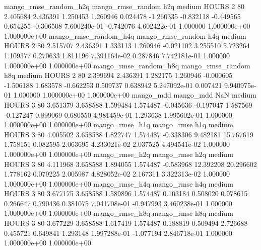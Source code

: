 mango_rmse_random_h2q mango_rmse_random                  h2q     medium    HOURS                 2 80  2.405684       2.436391 1.250453       1.260946    0.024478     -1.260335     -0.832118    -0.449565       0.654255 -0.306508 7.600240e-01    -0.742076   4.602422e-01            1.000000    1.000000e+00        1.000000e+00
mango_rmse_random_h4q mango_rmse_random                  h4q     medium    HOURS                 2 80  2.515707       2.436391 1.333113       1.260946   -0.021102      3.255510      5.723264     1.109377       0.270633  1.811196 7.391164e-02     0.287846   7.742181e-01            1.000000    1.000000e+00        1.000000e+00
mango_rmse_random_h8q mango_rmse_random                  h8q     medium    HOURS                 2 80  2.399694       2.436391 1.282175       1.260946   -0.000605     -1.506188      1.683578    -0.662253       0.509737  0.638942 5.247092e-01     0.007421   9.940975e-01            1.000000    1.000000e+00        1.000000e+00
            mango_mdd         mango_mdd                  NaN     medium    HOURS                 3 80  3.651379       3.658588 1.599484       1.574487   -0.045636     -0.197047      1.587569    -0.127247       0.899069  0.680550 4.981459e-01     1.293638   1.995602e-01            1.000000    1.000000e+00        1.000000e+00
       mango_rmse_h1q        mango_rmse                  h1q     medium    HOURS                 3 80  4.005502       3.658588 1.822747       1.574487   -0.338306      9.482181     15.767619     1.758151       0.082595  2.063695 4.233021e-02     2.037525   4.494541e-02            1.000000    1.000000e+00        1.000000e+00
       mango_rmse_h2q        mango_rmse                  h2q     medium    HOURS                 3 80  4.111968       3.658588 1.894055       1.574487   -0.583968     12.392208     20.296602     1.778162       0.079225  2.005987 4.828052e-02     2.167311   3.322313e-02            1.000000    1.000000e+00        1.000000e+00
       mango_rmse_h4q        mango_rmse                  h4q     medium    HOURS                 3 80  3.677175       3.658588 1.589896       1.574487    0.103184      0.508020      0.978615     0.266647       0.790436  0.381075 7.041708e-01    -0.947993   3.460238e-01            1.000000    1.000000e+00        1.000000e+00
       mango_rmse_h8q        mango_rmse                  h8q     medium    HOURS                 3 80  3.677229       3.658588 1.617419       1.574487    0.188819      0.509494      2.726688     0.455721       0.649841  1.293148 1.997288e-01    -1.077194   2.846718e-01            1.000000    1.000000e+00        1.000000e+00
